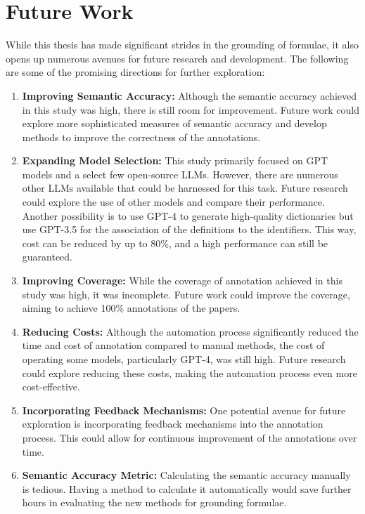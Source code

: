 \chapter{Future Work}\label{chapter:future_works}

While this thesis has made significant strides in the grounding of formulae, it also opens up numerous avenues for future research and development. The following are some of the promising directions for further exploration:

\begin{enumerate}

\item \textbf{Improving Semantic Accuracy:} Although the semantic accuracy achieved in this study was high, there is still room for improvement. Future work could explore more sophisticated measures of semantic accuracy and develop methods to improve the correctness of the annotations. 

\item \textbf{Expanding Model Selection:} This study primarily focused on GPT models and a select few open-source LLMs. However, there are numerous other LLMs available that could be harnessed for this task. Future research could explore the use of other models and compare their performance. Another possibility is to use GPT-4 to generate high-quality dictionaries but use GPT-3.5 for the association of the definitions to the identifiers. This way, cost can be reduced by up to 80\%, and a high performance can still be guaranteed.

\item \textbf{Improving Coverage:} While the coverage of annotation achieved in this study was high, it was incomplete. Future work could improve the coverage, aiming to achieve 100\% annotations of the papers.

\item \textbf{Reducing Costs:} Although the automation process significantly reduced the time and cost of annotation compared to manual methods, the cost of operating some models, particularly GPT-4, was still high. Future research could explore reducing these costs, making the automation process even more cost-effective.

\item \textbf{Incorporating Feedback Mechanisms:} One potential avenue for future exploration is incorporating feedback mechanisms into the annotation process. This could allow for continuous improvement of the annotations over time.

\item \textbf{Semantic Accuracy Metric:} Calculating the semantic accuracy manually is tedious. Having a method to calculate it automatically would save further hours in evaluating the new methods for grounding formulae.

\end{enumerate}

